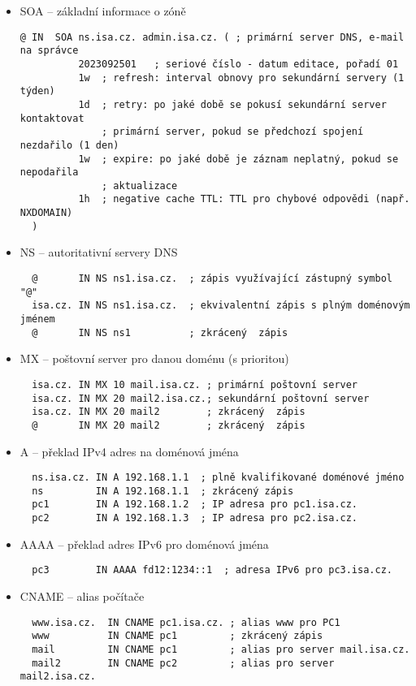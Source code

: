 \begin{itemize}
  \item SOA -- základní informace o zóně
\begin{verbatim}
@ IN  SOA ns.isa.cz. admin.isa.cz. ( ; primární server DNS, e-mail na správce
          2023092501   ; seriové číslo - datum editace, pořadí 01
          1w  ; refresh: interval obnovy pro sekundární servery (1 týden)
          1d  ; retry: po jaké době se pokusí sekundární server kontaktovat
              ; primární server, pokud se předchozí spojení nezdařilo (1 den)
          1w  ; expire: po jaké době je záznam neplatný, pokud se nepodařila
              ; aktualizace
          1h  ; negative cache TTL: TTL pro chybové odpovědi (např. NXDOMAIN)
  )
\end{verbatim}
  \clearpage
  \item NS -- autoritativní servery DNS 
\begin{verbatim}
  @       IN NS ns1.isa.cz.  ; zápis využívající zástupný symbol "@"
  isa.cz. IN NS ns1.isa.cz.  ; ekvivalentní zápis s plným doménovým jménem
  @       IN NS ns1          ; zkrácený  zápis
\end{verbatim}        
  \item MX -- poštovní server pro danou doménu (s prioritou)
\begin{verbatim}
  isa.cz. IN MX 10 mail.isa.cz. ; primární poštovní server 
  isa.cz. IN MX 20 mail2.isa.cz.; sekundární poštovní server
  isa.cz. IN MX 20 mail2        ; zkrácený  zápis
  @       IN MX 20 mail2        ; zkrácený  zápis
\end{verbatim}        
  \item A -- překlad IPv4 adres na doménová jména
\begin{verbatim}
  ns.isa.cz. IN A 192.168.1.1  ; plně kvalifikované doménové jméno
  ns         IN A 192.168.1.1  ; zkrácený zápis
  pc1        IN A 192.168.1.2  ; IP adresa pro pc1.isa.cz.
  pc2        IN A 192.168.1.3  ; IP adresa pro pc2.isa.cz.
\end{verbatim}        
  \item AAAA -- překlad adres IPv6 pro doménová jména
\begin{verbatim}
  pc3        IN AAAA fd12:1234::1  ; adresa IPv6 pro pc3.isa.cz.
\end{verbatim}        
  \item CNAME -- alias počítače
\begin{verbatim}
  www.isa.cz.  IN CNAME pc1.isa.cz. ; alias www pro PC1
  www          IN CNAME pc1         ; zkrácený zápis
  mail         IN CNAME pc1         ; alias pro server mail.isa.cz.
  mail2        IN CNAME pc2         ; alias pro server mail2.isa.cz.   
\end{verbatim}        
\end{itemize}

